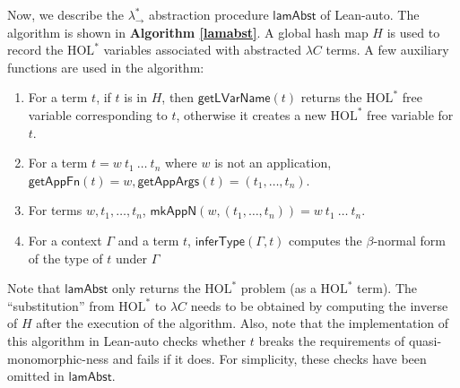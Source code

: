 Now, we describe the $\lambda_\to^*$ abstraction procedure $\mathsf{lamAbst}$ of Lean-auto. The algorithm
is shown in \textbf{Algorithm \ref{lamabst}}. A global hash map $H$ is used to record the $\text{HOL}^*$
variables associated with abstracted $\lambda C$ terms. A few auxiliary functions are used in the algorithm:
\begin{enumerate}
  \item For a term $t$, if $t$ is in $H$, then $\mathsf{getLVarName}(t)$ returns
    the $\text{HOL}^*$ free variable corresponding to $t$, otherwise it creates a new $\text{HOL}^*$ free variable for $t$.
  \item For a term $t = w \ t_1 \ \dots \ t_n$ where $w$ is not an application,
    $\mathsf{getAppFn}(t) = w, \mathsf{getAppArgs}(t) = (t_1, \dots, t_n)$.
  \item For terms $w, t_1, \dots, t_n$, $\mathsf{mkAppN}(w, (t_1, \dots, t_n)) = w \ t_1 \ \dots \ t_n$.
  \item For a context $\Gamma$ and a term $t$, $\mathsf{inferType}(\Gamma, t)$ computes the
    $\beta$-normal form of the type of $t$ under $\Gamma$
\end{enumerate}
Note that $\mathsf{lamAbst}$ only returns the $\text{HOL}^*$ problem (as a $\text{HOL}^*$ term). The
``substitution'' from $\text{HOL}^*$ to $\lambda C$ needs to be obtained by computing the inverse of $H$ after
the execution of the algorithm. Also, note that the implementation of this algorithm in Lean-auto checks
whether $t$ breaks the requirements of quasi-monomorphic-ness and fails if it
does. For simplicity, these checks have been omitted in $\mathsf{lamAbst}$.

